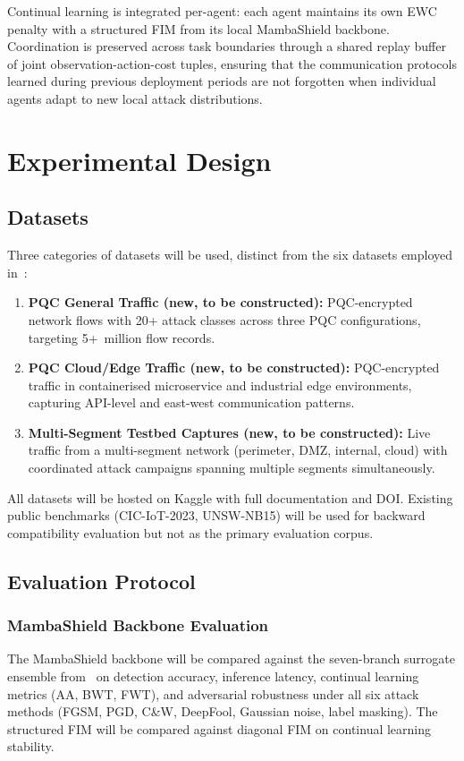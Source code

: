 \documentclass[12pt,a4paper]{article}
\theoremstyle{definition}
\begin{document}
Continual learning is integrated per-agent: each agent maintains its own EWC penalty with a structured FIM from its local MambaShield backbone. Coordination is preserved across task boundaries through a shared replay buffer of joint observation-action-cost tuples, ensuring that the communication protocols learned during previous deployment periods are not forgotten when individual agents adapt to new local attack distributions.

\section{Experimental Design}
\label{sec:experiments}

\subsection{Datasets}

Three categories of datasets will be used, distinct from the six datasets employed in~\cite{anaedevha2026cl_rl}:
\begin{enumerate}
\item \textbf{PQC General Traffic (new, to be constructed):} PQC-encrypted network flows with 20+ attack classes across three PQC configurations, targeting 5+~million flow records.
\item \textbf{PQC Cloud/Edge Traffic (new, to be constructed):} PQC-encrypted traffic in containerised microservice and industrial edge environments, capturing API-level and east-west communication patterns.
\item \textbf{Multi-Segment Testbed Captures (new, to be constructed):} Live traffic from a multi-segment network (perimeter, DMZ, internal, cloud) with coordinated attack campaigns spanning multiple segments simultaneously.
\end{enumerate}

All datasets will be hosted on Kaggle with full documentation and DOI. Existing public benchmarks (CIC-IoT-2023, UNSW-NB15) will be used for backward compatibility evaluation but not as the primary evaluation corpus.

\subsection{Evaluation Protocol}

\subsubsection{MambaShield Backbone Evaluation}
The MambaShield backbone will be compared against the seven-branch surrogate ensemble from~\cite{anaedevha2026cl_rl} on detection accuracy, inference latency, continual learning metrics (AA, BWT, FWT), and adversarial robustness under all six attack methods (FGSM, PGD, C\&W, DeepFool, Gaussian noise, label masking). The structured FIM will be compared against diagonal FIM on continual learning stability.
\end{document}
